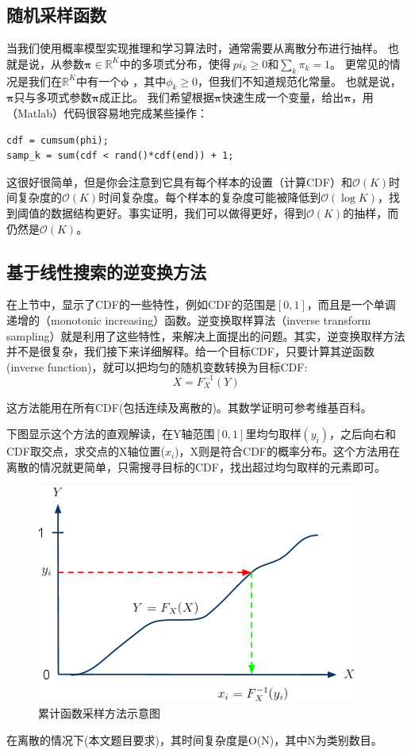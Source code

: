 \subsection{随机采样函数}
当我们使用概率模型实现推理和学习算法时，通常需要从离散分布进行抽样。 也就是说，从参数$\boldsymbol {\pi} \in \mathbb{R} ^ K$中的多项式分布，使得$\ pi_k \geq 0$和$\sum_{k} \pi_k = 1$。 更常见的情况是我们在$\mathbb{R}^K$中有一个$\boldsymbol {\phi}$ ，其中$\phi_k \geq 0$，但我们不知道规范化常量。 也就是说，$\boldsymbol{\pi}$只与多项式参数$\boldsymbol {\pi}$成正比。 我们希望根据$\boldsymbol{\pi}$快速生成一个变量，给出$\boldsymbol {\pi}$，用（Matlab）代码很容易地完成某些操作：
\begin{verbatim}
cdf = cumsum(phi);
samp_k = sum(cdf < rand()*cdf(end)) + 1;
\end{verbatim}
这很好很简单，但是你会注意到它具有每个样本的设置（计算CDF）和$\mathcal {O}(K)$时间复杂度的$\mathcal {O}(K)$时间复杂度。每个样本的复杂度可能被降低到$\mathcal {O}(\log K)$，找到阈值的数据结构更好。事实证明，我们可以做得更好，得到$\mathcal {O}(K)$的抽样，而仍然是$\mathcal {O}(K)$。
\subsection{基于线性搜索的逆变换方法}
在上节中，显示了CDF的一些特性，例如CDF的范围是$[0,1]$，而且是一个单调递增的（monotonic increasing）函数。逆变换取样算法（inverse transform sampling）就是利用了这些特性，来解决上面提出的问题。其实，逆变换取样方法并不是很复杂，我们接下来详细解释。给一个目标CDF，只要计算其逆函数(inverse function)，就可以把均匀的随机变数转换为目标CDF:
\begin{equation}\label{equ:func}
  X=F_X^{-1}(Y)
\end{equation}

这方法能用在所有CDF(包括连续及离散的)。其数学证明可参考维基百科。

下图显示这个方法的直观解读，在Y轴范围$[0,1]$里均匀取样$(y_i)$，之后向右和CDF取交点，求交点的X轴位置($x_i$)，X则是符合CDF的概率分布。这个方法用在离散的情况就更简单，只需搜寻目标的CDF，找出超过均匀取样的元素即可。
\begin{figure}[!h]
  \centering
\includegraphics[width=0.5\linewidth]{./figures/cdf.png}
\caption{累计函数采样方法示意图}\label{fig:cdf}
\end{figure}
在离散的情况下(本文题目要求)，其时间复杂度是O(N)，其中N为类别数目。

